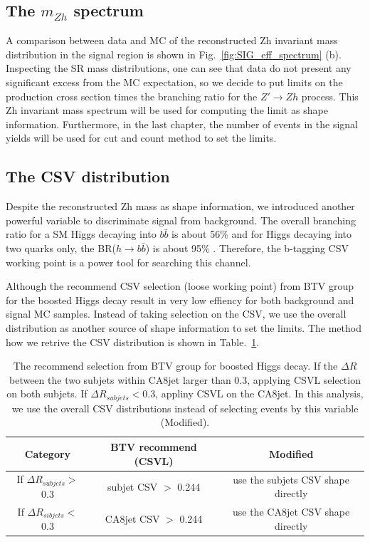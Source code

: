 \subsection{The $m_{Zh}$ spectrum}
A comparison between data and MC of the reconstructed Zh invariant mass distribution in the signal region is shown in Fig.~\ref{fig:SIG_eff_spectrum} (b). Inspecting the SR mass distributions, one can see that data do not present any significant excess from the MC expectation, so we decide to put limits on the production cross section times the branching ratio for the $Z' \rightarrow Zh$ process. This Zh invariant mass spectrum will be used for computing the limit as shape information. Furthermore, in the last chapter, the number of events in the signal yields will be used for cut and count method to set the limits.

\newpage
\subsection{The CSV distribution}
Despite the reconstructed Zh mass as shape information, we introduced another powerful variable to discriminate signal from background. The overall branching ratio for a SM Higgs decaying into $b\bar{b}$ is about 56\% and for Higgs decaying into two quarks only, the BR($h\rightarrow b\bar{b}$) is about 95\% \cite{HiggsBR}. Therefore, the b-tagging CSV working point is a power tool for searching this channel.

Although the recommend CSV selection (loose working point) from BTV group\cite{BTV-13-001} for the boosted Higgs decay result in very low effiency for both background and signal MC samples. Instead of taking selection on the CSV, we use the overall distribution as another source of shape information to set the limits. The method how we retrive the CSV distribution is shown in Table.~\ref{tab:CSVsel}.

\begin{center}
  \begin{table}[h]
    \begin{center}
      \begin{tabular}{|c|c|c|}
        \hline
        \textbf{Category} & \textbf{BTV recommend (CSVL)} & \textbf{Modified} \\ \hline
        If $\Delta R_{subjets} > $ 0.3 & subjet CSV $>$ 0.244 & use the subjets CSV shape directly\\
        If $\Delta R_{sibjets} < $ 0.3 & CA8jet CSV $>$ 0.244 & use the CA8jet CSV shape directly\\
        \hline
      \end{tabular}
    \end{center}
    \caption{\label{tab:CSVsel}The recommend selection from BTV group for boosted Higgs decay. If the $\Delta R$ between the two subjets within CA8jet larger than 0.3, applying CSVL selection on both subjets. If $\Delta R_{subjets} < 0.3$, appliny CSVL on the CA8jet. In this analysis, we use the overall CSV distributions instead of selecting events by this variable (Modified).}
  \end{table}
\end{center}

